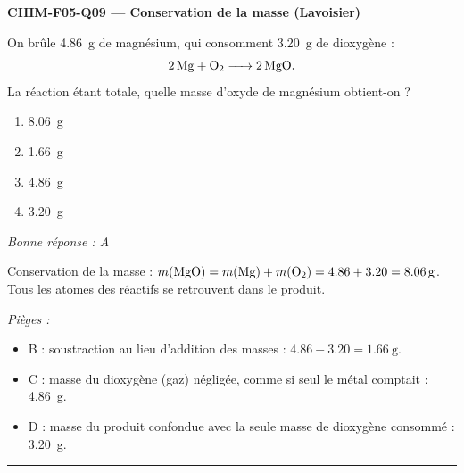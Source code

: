 \documentclass[11pt,a4paper]{article}
\begin{document}
\noindent\textbf{CHIM-F05-Q09 --- Conservation de la masse (Lavoisier)}\par
On brûle \qty{4.86}{\gram} de magnésium, qui consomment \qty{3.20}{\gram} de dioxygène :
\[\ce{2 Mg + O2 -> 2 MgO}.\]
La réaction étant totale, quelle masse d'oxyde de magnésium obtient-on ?
\begin{enumerate}[label=\Alph*)]
\item \qty{8.06}{\gram}
\item \qty{1.66}{\gram}
\item \qty{4.86}{\gram}
\item \qty{3.20}{\gram}
\end{enumerate}
\textit{Bonne réponse : A}\par
Conservation de la masse : $m(\ce{MgO})=m(\ce{Mg})+m(\ce{O2})=\num{4.86}+\num{3.20}=\qty{8.06}{\gram}$. Tous les atomes des réactifs se retrouvent dans le produit.\par
\textit{Pièges :}
\begin{itemize}
\item B : soustraction au lieu d'addition des masses : $\num{4.86}-\num{3.20}=\qty{1.66}{\gram}$.
\item C : masse du dioxygène (gaz) négligée, comme si seul le métal comptait : \qty{4.86}{\gram}.
\item D : masse du produit confondue avec la seule masse de dioxygène consommé : \qty{3.20}{\gram}.
\end{itemize}
\vspace{6pt}\hrule\vspace{8pt}
\end{document}

